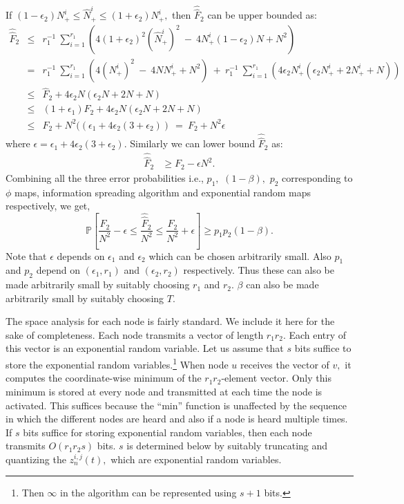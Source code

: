 \documentclass[10pt,twosided,a4paper,draft,onecolumn]{article}
\newcommand{\prob}[1]{\mathbb{P}\left[ #1 \right]}
\begin{document}
If $(1-\epsilon_2)N_+^i \leq \hat{N}_+^i \leq (1+\epsilon_2)N_+^i,$
then $\hat{\hat{F}}_2$ can be upper bounded as:
\begin{eqnarray*}
  \hat{\hat{F}}_2 & \leq & r_1^{-1} \ \sum \limits_{i=1}^{r_1}
  \left( 4(1+\epsilon_2)^2 \left( \hat{N}_+^i \right)^2 \ - \  
    4N_+^i(1-\epsilon_2)N  + N^2 \right) \\  
  & = & r_1^{-1} \ \sum \limits_{i=1}^{r_1} \left( 4 \left({N}_+^i
    \right)^2 \ - \ 4NN_+^i +N^2 \right) \ + \ r_1^{-1} \ \sum
  \limits_{i=1}^{r_1}\left(4\epsilon_2N_+^i (\epsilon_2N_+^i + 
    2N_+^i +N) \right) \\ 
  & \leq & \hat{F}_2 +  4\epsilon_2N(\epsilon_2N + 2N +N)\\ 
  & \leq & (1+\epsilon_1)F_2 + 4\epsilon_2N(\epsilon_2N + 2N +N) \\
  & \leq & F_2 +N^2((\epsilon_1 + 4\epsilon_2(3+\epsilon_2)) \ = \ F_2
  + N^2 \epsilon  
\end{eqnarray*}
where $\epsilon = \epsilon_1 + 4\epsilon_2(3+\epsilon_2).$ Similarly
we can lower bound $\hat{\hat{F}}_2$ as:
\begin{eqnarray*}
  \hat{\hat{F}}_2 &\geq F_2 - \epsilon N^2.
\end{eqnarray*}
Combining all the three error probabilities i.e., $p_1,$ $(1-\beta),$
$p_2$ corresponding to $\phi$ maps, information spreading algorithm
and exponential random maps respectively, we get, 
\begin{displaymath}
  \prob{\frac{F_2}{N^2} - \epsilon \leq \frac{\hat{\hat{F}}_2}{N^2}
    \leq \frac{F_2}{N^2} + \epsilon} \geq p_1p_2(1-\beta).
\end{displaymath}
Note that $\epsilon$ depends on $\epsilon_1$ and $\epsilon_2$ which
can be chosen arbitrarily small. Also $p_1$ and $p_2$ depend on
$(\epsilon_1,r_1)$ and $(\epsilon_2, r_2)$ respectively. Thus these
can also be made arbitrarily small by suitably choosing $r_1$ and
$r_2.$ $\beta$ can also be made arbitrarily small by suitably choosing
$T.$ 

The space analysis for each node is fairly standard. We include it
here for the sake of completeness. Each node transmits a vector of
length $r_1r_2$. Each entry of this vector is an exponential random
variable. Let us assume that $s$ bits suffice to store the exponential
random variables.\footnote{Then $\infty$ in the algorithm can be
  represented using $s+1$ bits.} When node $u$ receives the vector of
$v,$ it computes the coordinate-wise minimum of the $r_1r_2$-element
vector. Only this minimum is stored at every node and transmitted at
each time the node is activated. This suffices because the ``min''
function is unaffected by the sequence in which the different nodes
are heard and also if a node is heard multiple times.  If $s$ bits
suffice for storing exponential random variables, then each node
transmits $O(r_1r_2s)$ bits. $s$ is determined below by suitably
truncating and quantizing the $z_n^{i,j}(t),$ which are exponential
random variables. 
\end{document}
